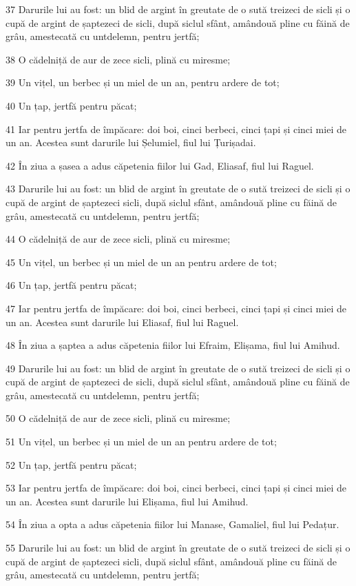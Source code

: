 \par 37 Darurile lui au fost: un blid de argint în greutate de o sută treizeci de sicli și o cupă de argint de șaptezeci de sicli, după siclul sfânt, amândouă pline cu făină de grâu, amestecată cu untdelemn, pentru jertfă;
\par 38 O cădelniță de aur de zece sicli, plină cu miresme;
\par 39 Un vițel, un berbec și un miel de un an, pentru ardere de tot;
\par 40 Un țap, jertfă pentru păcat;
\par 41 Iar pentru jertfa de împăcare: doi boi, cinci berbeci, cinci țapi și cinci miei de un an. Acestea sunt darurile lui Șelumiel, fiul lui Țurișadai.
\par 42 În ziua a șasea a adus căpetenia fiilor lui Gad, Eliasaf, fiul lui Raguel.
\par 43 Darurile lui au fost: un blid de argint în greutate de o sută treizeci de sicli și o cupă de argint de șaptezeci sicli, după siclul sfânt, amândouă pline cu făină de grâu, amestecată cu untdelemn, pentru jertfă;
\par 44 O cădelniță de aur de zece sicli, plină cu miresme;
\par 45 Un vițel, un berbec și un miel de un an pentru ardere de tot;
\par 46 Un țap, jertfă pentru păcat;
\par 47 Iar pentru jertfa de împăcare: doi boi, cinci berbeci, cinci țapi și cinci miei de un an. Acestea sunt darurile lui Eliasaf, fiul lui Raguel.
\par 48 În ziua a șaptea a adus căpetenia fiilor lui Efraim, Elișama, fiul lui Amihud.
\par 49 Darurile lui au fost: un blid de argint în greutate de o sută treizeci de sicli și o cupă de argint de șaptezeci de sicli, după siclul sfânt, amândouă pline cu făină de grâu, amestecată cu untdelemn, pentru jertfă;
\par 50 O cădelniță de aur de zece sicli, plină cu miresme;
\par 51 Un vițel, un berbec și un miel de un an pentru ardere de tot;
\par 52 Un țap, jertfă pentru păcat;
\par 53 Iar pentru jertfa de împăcare: doi boi, cinci berbeci, cinci țapi și cinci miei de un an. Acestea sunt darurile lui Elișama, fiul lui Amihud.
\par 54 În ziua a opta a adus căpetenia fiilor lui Manase, Gamaliel, fiul lui Pedațur.
\par 55 Darurile lui au fost: un blid de argint în greutate de o sută treizeci de sicli și o cupă de argint de șaptezeci sicli, după siclul sfânt, amândouă pline cu făină de grâu, amestecată cu untdelemn, pentru jertfă;
